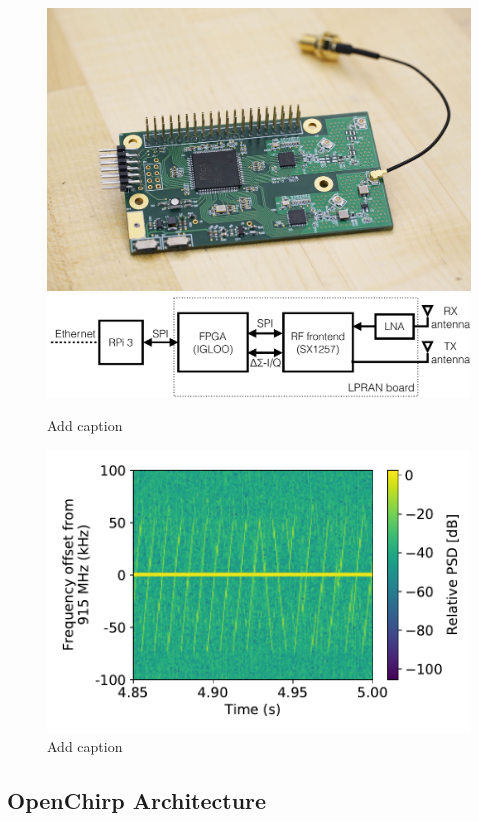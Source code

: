 \documentclass[conference]{IEEEtran}
\begin{document}
\begin{figure}[!htb]
    \centering
    \includegraphics[width=0.5\linewidth]{figures/gw-anon-sm}
    \\
    \includegraphics[width=0.8\linewidth]{figures/lpran-block_cropped}
    \caption{{\color{red} Add caption}}
    \label{fig:lpran-photo}
\end{figure}

\begin{figure}[!htb]
    \centering
    \includegraphics[width=0.8\linewidth]{figures/LPRAN_spectrogram}
    \caption{{\color{red} Add caption}}
    \label{fig:lpran-spectrogram}
\end{figure}

\subsection{OpenChirp Architecture}
\label{sec:oc-arch}
\end{document}
